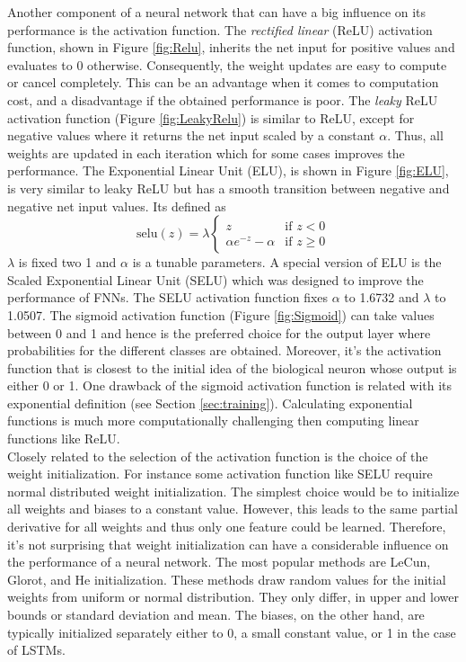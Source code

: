 Another component of a neural network that can have a big influence on its performance is the activation function. The \textit{rectified linear} (ReLU) activation function, shown in Figure \ref{fig:Relu}, inherits the net input for positive values and evaluates to 0 otherwise. Consequently, the weight updates are easy to compute or cancel completely. This can be an advantage when it comes to computation cost, and a disadvantage if the obtained performance is poor. The \textit{leaky} ReLU activation function (Figure \ref{fig:LeakyRelu}) is similar to ReLU, except for negative values where it returns the net input scaled by a constant $\alpha$. Thus, all weights are updated in each iteration which for some cases improves the performance. The Exponential Linear Unit (ELU), is shown in Figure \ref{fig:ELU}, is very similar to leaky ReLU but has a smooth transition between negative and negative net input values. Its defined as
\begin{equation}
\label{eq:selu}
\text{selu}(z) = \lambda \begin{cases}
z &\text{if}\,\, z < 0 \\
\alpha e^{-z}-\alpha &\text{if}\,\, z \geq 0
\end{cases}
\end{equation}
$\lambda$ is fixed two 1 and $\alpha$ is a tunable parameters. A special version of ELU is the Scaled Exponential Linear Unit (SELU) which was designed to improve the performance of FNNs. The SELU activation function fixes $\alpha$ to 1.6732 and $\lambda$ to 1.0507. The sigmoid activation function (Figure \ref{fig:Sigmoid}) can take values between 0 and 1 and hence is the preferred choice for the output layer where probabilities for the different classes are obtained. Moreover, it's the activation function that is closest to the initial idea of the biological neuron whose output is either 0 or 1. One drawback of the sigmoid activation function is related with its exponential definition (see Section \ref{sec:training}). Calculating exponential functions is much more computationally challenging then computing linear functions like ReLU. \\
Closely related to the selection of the activation function is the choice of the weight initialization. For instance some activation function like SELU require normal distributed weight initialization. The simplest choice would be to initialize all weights and biases to a constant value. However, this leads to the same partial derivative for all weights and thus only one feature could be learned. Therefore, it's not surprising that weight initialization can have a considerable influence on the performance of a neural network. The most popular methods are LeCun, Glorot, and He initialization. These methods draw random values for the initial weights from uniform or normal distribution. They only differ, in upper and lower bounds or standard deviation and mean. The biases, on the other hand, are typically initialized separately either to 0, a small constant value, or 1 in the case of LSTMs.

